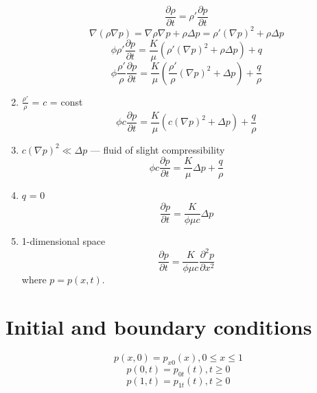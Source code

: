 \documentclass{article}
\begin{document}
\begin{enumerate}
\begin{equation}
\frac{\partial \rho}{\partial t} = \rho' \frac{\partial p}{\partial t}
\end{equation}
\begin{equation}
\nabla (\rho \nabla p) = \nabla \rho \nabla p + \rho \Delta p = \rho' (\nabla
p)^2 + \rho \Delta p
\end{equation}
\begin{equation}
\phi \rho' \frac{\partial p}{\partial t} = \frac{K}{\mu} \left(\rho' (\nabla
p)^2 + \rho \Delta p \right) + q
\end{equation}
\begin{equation}
\phi \frac{\rho'}{\rho} \frac{\partial p}{\partial t} = \frac{K}{\mu}
\left(\frac{\rho'}{\rho} (\nabla p)^2 + \Delta p \right) + \frac{q}{\rho}
\end{equation}
\item $\frac{\rho'}{\rho}$ = $c$ = const
\begin{equation}
\phi c \frac{\partial p}{\partial t} = \frac{K}{\mu} \left(c (\nabla p)^2 +
\Delta p \right) + \frac{q}{\rho}
\end{equation}
\item $c (\nabla p)^2 \ll \Delta p$ --- fluid of slight compressibility
\begin{equation}
\phi c \frac{\partial p}{\partial t} = \frac{K}{\mu} \Delta p + \frac{q}{\rho}
\end{equation}
\item $q$ = 0
\begin{equation}
\frac{\partial p}{\partial t} = \frac{K}{\phi \mu c} \Delta p
\end{equation}
\item 1-dimensional space
\begin{equation}
\frac{\partial p}{\partial t} = \frac{K}{\phi \mu c} \frac{\partial^2
p}{\partial x^2}
\end{equation}
where $p = p(x, t)$.
\end{enumerate}

\section{Initial and boundary conditions}
\begin{equation}
p(x, 0) = p_{x 0}(x), 0 \leq x \leq 1
\end{equation}
\begin{equation}
p(0, t) = p_{0 t}(t), t \geq 0
\end{equation}
\begin{equation}
p(1, t) = p_{1 t}(t), t \geq 0
\end{equation}


\end{document}
